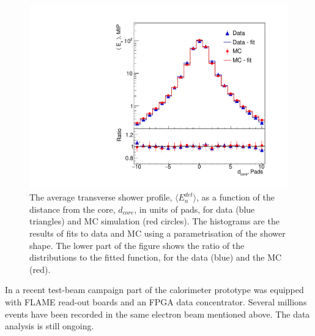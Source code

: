 \begin{figure}
    \centering
    \includegraphics[width=\textwidth]{Calorimeter/FCAL/figs/MR_5GeV_EffS_v3.pdf}
    \caption{The average transverse shower profile, $\langle E^{det}_{n} \rangle$, as a function 
of the distance from the core, $d_{core}$, in units of pads, for data (blue triangles) and MC 
simulation (red circles). The histograms are the results of fits to data and MC using a parametrisation of the 
shower shape. The lower part of the figure shows the ratio 
of the distributions to the fitted function, for the data (blue) and the MC (red).}
    \label{MR_5GeV}
\end{figure}
In a recent test-beam campaign part of the calorimeter prototype was equipped with FLAME read-out boards and an FPGA data concentrator. Several millions events have been recorded in the same electron beam mentioned above. The data analysis is still ongoing.

